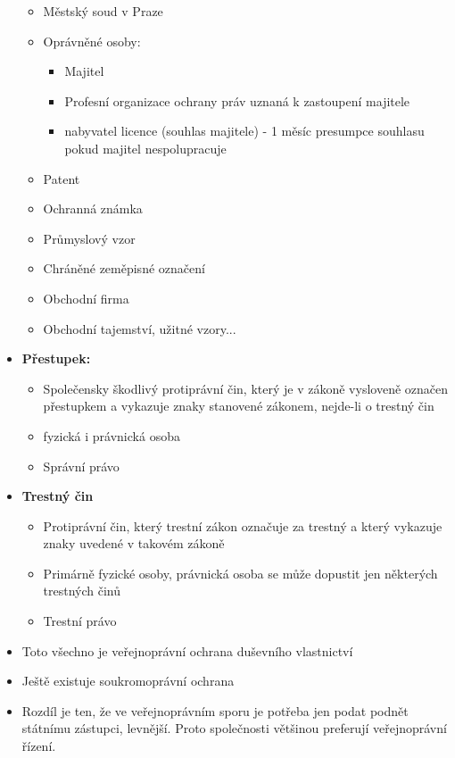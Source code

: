 \begin{itemize}
\begin{itemize}
        \item Městský soud  v Praze
        \item Oprávněné osoby:
        \begin{itemize}
            \item Majitel 
            \item Profesní organizace ochrany práv uznaná k zastoupení majitele
            \item nabyvatel licence (souhlas majitele) - 1 měsíc presumpce souhlasu pokud majitel nespolupracuje
        \end{itemize}
        \item Patent
        \item Ochranná známka
        \item Průmyslový vzor
        \item Chráněné zeměpisné označení
        \item Obchodní firma
        \item Obchodní tajemství, užitné vzory...
    \end{itemize}
    \item \textbf{Přestupek:}\begin{itemize}
        \item Společensky škodlivý protiprávní čin, který je v zákoně vysloveně označen přestupkem a vykazuje znaky stanovené zákonem, nejde-li o trestný čin
        \item fyzická i právnická osoba
        \item Správní právo
    \end{itemize}
    \item \textbf{Trestný čin}\begin{itemize}
        \item Protiprávní čin, který trestní zákon označuje za trestný a který vykazuje znaky uvedené v takovém zákoně
        \item Primárně fyzické osoby, právnická osoba se může dopustit jen některých trestných činů
        \item Trestní právo
    \end{itemize}
    \item Toto všechno je veřejnoprávní ochrana duševního vlastnictví
    \item Ještě existuje soukromoprávní ochrana
    \item Rozdíl je ten, že ve veřejnoprávním sporu je potřeba jen podat podnět státnímu zástupci, levnější. Proto společnosti většinou preferují veřejnoprávní řízení.
\end{itemize}

